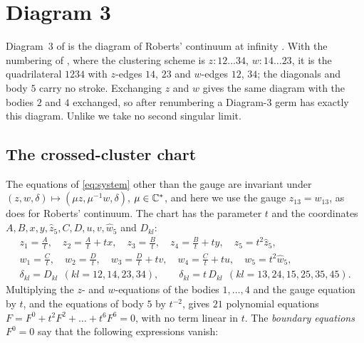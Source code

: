 \section{Diagram 3}\label{sec:d3}

Diagram~3 of \cite[Fig.~11]{AK} is the diagram of Roberts' continuum at infinity
\cite[\S7.2]{AK}.  With the numbering of \cite[\S5.2 and \S8.3]{AK}, where the clustering scheme
is $z:12\ldots34$, $w:14\ldots23$, it is the quadrilateral $1234$ with $z$-edges $14$, $23$ and
$w$-edges $12$, $34$; the diagonals and body $5$ carry no stroke.  Exchanging $z$ and $w$ gives
the same diagram with the bodies $2$ and $4$ exchanged, so after renumbering a Diagram-3 germ has
exactly this diagram.  Unlike \cite[proof of Thm.~6(iii)]{AK} we take no second singular limit.

\subsection{The crossed-cluster chart}
The equations of \eqref{eq:system} other than the gauge are invariant under
$(z,w,\delta)\mapsto(\mu z,\mu^{-1}w,\delta)$, $\mu\in\mathbb{C}^*$, and here we use the gauge
$z_{13}=w_{13}$, as \cite[p.~543]{AK} does for Roberts' continuum.  The chart has the parameter
$t$ and the coordinates $A,B,x,y,\hat z_5,C,D,u,v,\hat w_5$ and $D_{kl}$:
\begin{equation}\label{eq:d3-chart}
\begin{gathered}
z_1=\tfrac{A}{t},\quad z_2=\tfrac{A}{t}+tx,\quad z_3=\tfrac{B}{t},\quad z_4=\tfrac{B}{t}+ty,
\quad z_5=t^2\hat z_5,\\
w_1=\tfrac{C}{t},\quad w_2=\tfrac{D}{t},\quad w_3=\tfrac{D}{t}+tv,\quad w_4=\tfrac{C}{t}+tu,
\quad w_5=t^2\hat w_5,\\
\delta_{kl}=D_{kl}\ \ (kl=12,14,23,34),\qquad
\delta_{kl}=t\,D_{kl}\ \ (kl=13,24,15,25,35,45).
\end{gathered}
\end{equation}
Multiplying the $z$- and $w$-equations of the bodies $1,\dots,4$ and the gauge equation by $t$,
and the equations of body $5$ by $t^{-2}$, gives $21$ polynomial equations
$F=F^0+t^2F^2+\dots+t^6F^6=0$, with no term linear in $t$.  The \emph{boundary equations}
$F^0=0$ say that the following expressions vanish:
